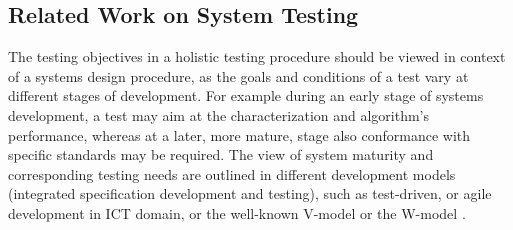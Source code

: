 \subsection{Related Work on System Testing}
The testing objectives in a holistic testing procedure should be viewed in context of a systems design procedure, as the goals and conditions of a test vary at different stages of development. For example during an early stage of systems development, a test may aim at the characterization and algorithm's performance, whereas at a later, more mature, stage also conformance with specific standards may be required. The view of system maturity and corresponding testing needs are outlined in different development models (integrated specification development and testing), such as test-driven, or agile development in ICT domain, or the well-known V-model or the W-model \cite{beizer1990}. %